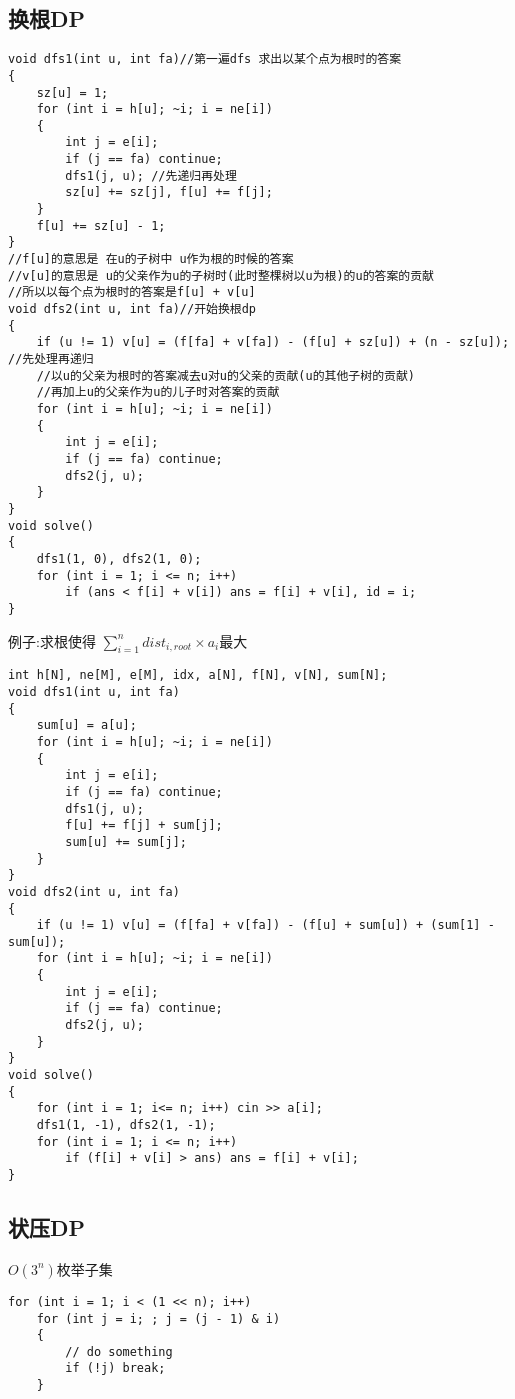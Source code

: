 \documentclass[a4paper, fontset=none]{ctexart}
\begin{document}
\subsection{换根DP}

\begin{verbatim}
void dfs1(int u, int fa)//第一遍dfs 求出以某个点为根时的答案
{
    sz[u] = 1;
    for (int i = h[u]; ~i; i = ne[i])
    {
        int j = e[i];
        if (j == fa) continue;
        dfs1(j, u); //先递归再处理
        sz[u] += sz[j], f[u] += f[j];
    }
    f[u] += sz[u] - 1;
}
//f[u]的意思是 在u的子树中 u作为根的时候的答案
//v[u]的意思是 u的父亲作为u的子树时(此时整棵树以u为根)的u的答案的贡献
//所以以每个点为根时的答案是f[u] + v[u]
void dfs2(int u, int fa)//开始换根dp
{
    if (u != 1) v[u] = (f[fa] + v[fa]) - (f[u] + sz[u]) + (n - sz[u]); //先处理再递归
    //以u的父亲为根时的答案减去u对u的父亲的贡献(u的其他子树的贡献)
    //再加上u的父亲作为u的儿子时对答案的贡献
    for (int i = h[u]; ~i; i = ne[i])
    {
        int j = e[i];
        if (j == fa) continue;
        dfs2(j, u);
    }
}
void solve()
{
    dfs1(1, 0), dfs2(1, 0);
    for (int i = 1; i <= n; i++)
        if (ans < f[i] + v[i]) ans = f[i] + v[i], id = i;
}
\end{verbatim}

例子:求根使得 $\sum\limits_{i=1}^n{dist_{i, root}\times a_i}$最大

\begin{verbatim}
int h[N], ne[M], e[M], idx, a[N], f[N], v[N], sum[N];
void dfs1(int u, int fa)
{
    sum[u] = a[u];
    for (int i = h[u]; ~i; i = ne[i])
    {
        int j = e[i];
        if (j == fa) continue;
        dfs1(j, u);
        f[u] += f[j] + sum[j];
        sum[u] += sum[j];
    }
}
void dfs2(int u, int fa)
{
    if (u != 1) v[u] = (f[fa] + v[fa]) - (f[u] + sum[u]) + (sum[1] - sum[u]);
    for (int i = h[u]; ~i; i = ne[i])
    {
        int j = e[i];
        if (j == fa) continue;
        dfs2(j, u);
    }
}
void solve()
{
    for (int i = 1; i<= n; i++) cin >> a[i];
    dfs1(1, -1), dfs2(1, -1);
    for (int i = 1; i <= n; i++)
        if (f[i] + v[i] > ans) ans = f[i] + v[i];
}
\end{verbatim}
\subsection{状压DP}

$O(3 ^ n)$枚举子集

\begin{verbatim}
for (int i = 1; i < (1 << n); i++)
    for (int j = i; ; j = (j - 1) & i)
    {
        // do something
        if (!j) break;
    }
\end{verbatim}
\end{document}
